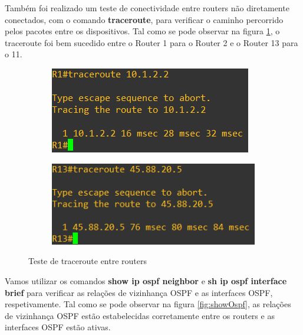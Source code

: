 \documentclass[11pt,english, openright, oneside]{book}
\begin{document}
\newpage
Também foi realizado um teste de conectividade entre routers não diretamente conectados, com o comando \textbf{traceroute}, para verificar o caminho percorrido pelos pacotes entre os dispositivos. Tal como se pode observar na figura \ref{fig:testeTraceroute}, o traceroute foi bem sucedido entre o Router 1 para o Router 2 e o Router 13 para o 11.
\vspace{0.2cm}

\begin{figure}[H]
  \centering
  \begin{subfigure}{.5\textwidth}
      \centering
      \includegraphics[width=0.94\linewidth]{imagens/Tarefa1/2.tracerouteR1_R2.png}
  \end{subfigure}%
  \begin{subfigure}{.5\textwidth}
      \centering
      \includegraphics[width=1\linewidth]{imagens/Tarefa1/2.tracerouteR13_R11.png}
  \end{subfigure}
  \caption{Teste de traceroute entre routers}
  \label{fig:testeTraceroute}
\end{figure}
\vspace{0.2cm}

Vamos utilizar os comandos \textbf{show ip ospf neighbor} e \textbf{sh ip ospf interface brief} para verificar as relações de vizinhança OSPF e as interfaces OSPF, respetivamente. Tal como se pode observar na figura \ref{fig:showOspf}, as relações de vizinhança OSPF estão estabelecidas corretamente entre os routers e as interfaces OSPF estão ativas.
\vspace{0.2cm}
\end{document}
